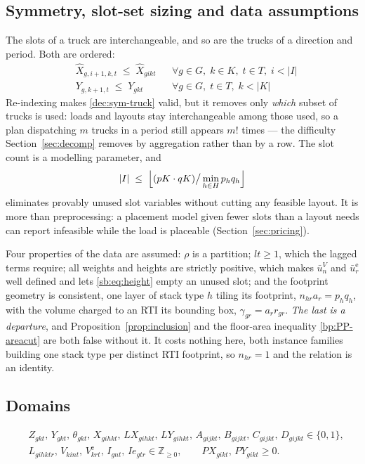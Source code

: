 \subsection{Symmetry, slot-set sizing and data assumptions}
\label{sb:sec:symm}

The slots of a truck are interchangeable, and so are the trucks of a
direction and period. Both are ordered:
\begin{align}
  & \widehat{X}_{g,i+1,k,t}\;\le\;\widehat{X}_{gikt}
    && \forall g\in G,\; k\in K,\; t\in T,\; i<|I|
    \label{sb:eq:sym}\\
  & Y_{g,k+1,t}\;\le\;Y_{gkt}
    && \forall g\in G,\; t\in T,\; k<|K|
    \label{dec:sym-truck}
\end{align}
Re-indexing makes \eqref{dec:sym-truck} valid, but it removes only
\emph{which} subset of trucks is used: loads and layouts stay
interchangeable among those used, so a plan dispatching $m$ trucks in a
period still appears $m!$ times --- the difficulty
Section~\ref{sec:decomp} removes by aggregation rather than by a row.
The slot count is a modelling parameter, and
\begin{equation}
|I|\;\le\;\Bigl\lfloor
    (pK\cdot qK)\big/\min_{h\in H} p_{h}q_{h}
\Bigr\rfloor
\label{sb:eq:Ibound}
\end{equation}
eliminates provably unused slot variables without cutting any feasible
layout. It is more than preprocessing: a placement model given fewer
slots than a layout needs can report infeasible while the load is
placeable (Section~\ref{sec:pricing}).

Four properties of the data are assumed: $\rho$ is a partition;
$lt\ge1$, which the lagged terms require; all weights and heights are
strictly positive, which makes $\bar u^{V}_{n}$ and
$\bar u^{\mathrm{e}}_{r}$ well defined and lets \eqref{sb:eq:height}
empty an unused slot; and the footprint geometry is consistent, one
layer of stack type $h$ tiling its footprint, $n_{hr}a_{r}=p_{h}q_{h}$,
with the volume charged to an RTI its bounding box,
$\gamma_{gr}=a_{r}r_{gr}$. \emph{The last is a departure}, and
Proposition~\ref{prop:inclusion} and the floor-area inequality
\eqref{bp:PP-areacut} are both false without it. It costs nothing
here, both instance families building one stack type per distinct RTI
footprint, so $n_{hr}=1$ and the relation is an identity.

\subsection{Domains}

\begin{align*}
&Z_{gkt},\,Y_{gkt},\,\theta_{gkt},\,X_{gihkt},\,LX_{gihkt},\,LY_{gihkt},\,
  A_{gijkt},\,B_{gijkt},\,C_{gijkt},\,D_{gijkt}\in\{0,1\},\\
&L_{gihktr},\,V_{kint},\,V^{\mathrm{e}}_{krt},\,I_{gnt},\,Ie_{gtr}
  \in\mathbb{Z}_{\ge 0},\qquad
PX_{gikt},\,PY_{gikt}\ge 0.
\end{align*}
